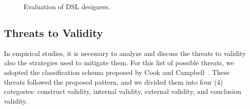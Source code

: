 \begin{figure}[!htb]
    \centering
    \caption{Evaluation of DSL designers.}
    \label{fig:inst4GERALExp}
    
\end{figure}



\subsection{Threats to Validity}
\label{ssec_experiments:preliminary_threats}

In empirical studies, it is necessary to analyze and discuss the threats to validity also the strategies used to mitigate them.
For this list of possible threats, we adopted the classification schema proposed by Cook and Campbell~\cite{Cook:1979}.
These threats followed the proposed pattern, and we divided them into four (4) categories: construct validity, internal validity, external validity, and conclusion validity.


